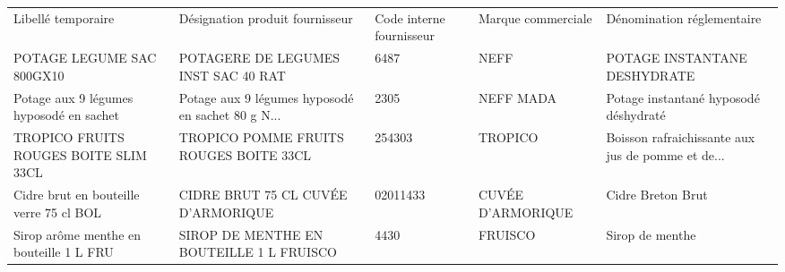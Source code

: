 \begin{tabular}{p{4cm}p{4cm}p{2cm}p{2cm}p{3cm}}
\toprule
                      Libellé temporaire &                    Désignation produit fournisseur & Code interne fournisseur & Marque commerciale &                         Dénomination réglementaire \\
              POTAGE LEGUME SAC 800GX10  &                POTAGERE DE LEGUMES INST SAC 40 RAT &                     6487 &               NEFF &                       POTAGE INSTANTANE DESHYDRATE \\
\midrule
 Potage aux 9 légumes hyposodé en sachet &  Potage aux 9 légumes hyposodé en sachet 80 g N... &                     2305 &          NEFF MADA &              Potage instantané hyposodé déshydraté \\
  TROPICO FRUITS ROUGES BOITE SLIM 33CL  &             TROPICO POMME FRUITS ROUGES BOITE 33CL &                   254303 &            TROPICO &  Boisson rafraichissante aux jus de pomme et de... \\
 Cidre brut en bouteille verre 75 cl BOL &                 CIDRE BRUT 75 CL CUVÉE D'ARMORIQUE &                 02011433 &  CUVÉE D'ARMORIQUE &                                  Cidre Breton Brut \\
 Sirop arôme menthe en bouteille 1 L FRU &           SIROP DE MENTHE EN BOUTEILLE 1 L FRUISCO &                     4430 &            FRUISCO &                                    Sirop de menthe \\
\bottomrule
\end{tabular}
